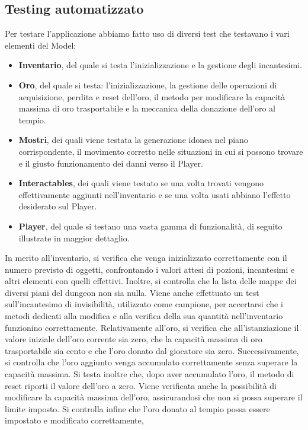 \documentclass{report}
\begin{document}
\subsection{Testing automatizzato}
Per testare l'applicazione abbiamo fatto uso di diversi test che testavano i vari elementi del Model:
\begin{itemize}
    \item \textbf{Inventario}, del quale si testa l’inizializzazione e la gestione degli incantesimi.
    \item \textbf{Oro}, del quale si testa: l’inizializzazione, la gestione delle operazioni di acquisizione, perdita e reset dell’oro, il metodo per modificare la capacità massima di oro trasportabile e la meccanica della donazione dell’oro al tempio.
    \item \textbf{Mostri}, dei quali viene testata la generazione idonea nel piano corrispondente, il movimento corretto nelle situazioni in cui si possono trovare e il giusto funzionamento dei danni verso il Player.
    \item \textbf{Interactables}, dei quali viene testato se una volta trovati vengono effettivamente aggiunti nell'inventario e se una volta usati abbiano l'effetto desiderato sul Player.
    \item \textbf{Player}, del quale si testano una vasta gamma di funzionalità, di seguito illustrate in maggior dettaglio.
\end{itemize} 
%
In merito all'inventario, si verifica che venga inizializzato correttamente con il numero previsto di oggetti, confrontando i valori attesi di pozioni, incantesimi e altri elementi con quelli effettivi. Inoltre, si controlla che 
%
la lista delle mappe dei diversi piani del dungeon non sia nulla. \newline
%
Viene anche effettuato un test sull’incantesimo di invisibilità, utilizzato come campione, per accertarsi che i metodi dedicati alla modifica e alla verifica della sua quantità nell’inventario funzionino correttamente. \newline
%
Relativamente all’oro, si verifica che all’istanziazione il valore iniziale dell’oro corrente sia zero, che la capacità massima di oro trasportabile sia cento e che l’oro donato dal giocatore sia zero. Successivamente, 
%
si controlla che l’oro aggiunto venga accumulato correttamente senza superare la capacità massima. Si testa inoltre che, dopo aver accumulato l’oro, il metodo di reset riporti il valore dell’oro a zero. \newline
%
Viene verificata anche la possibilità di modificare la capacità massima dell’oro, assicurandosi che non si possa superare il limite imposto. Si controlla infine che l’oro donato al tempio possa essere impostato e modificato correttamente,
\end{document}
